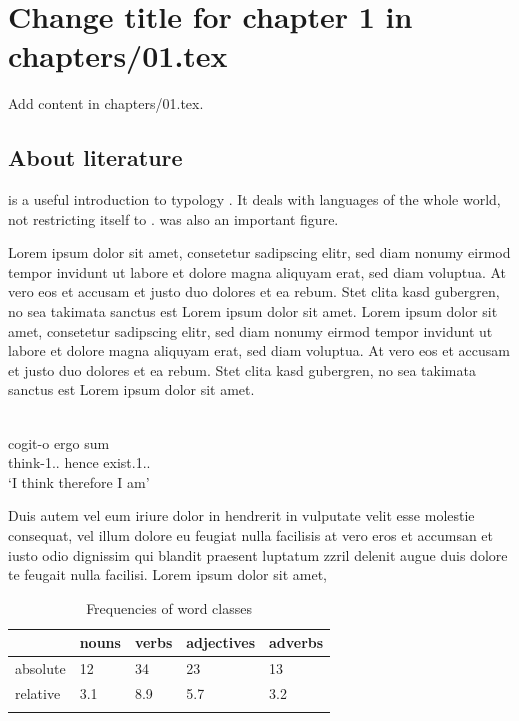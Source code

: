 \chapter{Change title for chapter 1 in chapters/01.tex}
Add content in chapters/01.tex.

\section{About literature}
\citet{Comrie1981} is a useful introduction to typology . %
It deals with languages of the whole world, not restricting itself to . %
 was also an important figure. %

Lorem ipsum dolor sit amet, consetetur sadipscing elitr, sed diam nonumy eirmod tempor invidunt ut labore et dolore magna aliquyam erat, sed diam voluptua. At vero eos et accusam et justo duo dolores et ea rebum. Stet clita kasd gubergren, no sea takimata sanctus est Lorem ipsum dolor sit amet. Lorem ipsum dolor sit amet, consetetur sadipscing elitr, sed diam nonumy eirmod tempor invidunt ut labore et dolore magna aliquyam erat, sed diam voluptua. At vero eos et accusam et justo duo dolores et ea rebum. Stet clita kasd gubergren, no sea takimata sanctus est Lorem ipsum dolor sit amet.

\ea\label{ex:1:descartes}
\\
\gll cogit-o ergo sum \\
     think-1{\sg}.{\prs}.{\ind} hence exist.1{\sg}.{\prs}.{\ind}\\
\glt `I think therefore I am'
\z

Duis autem vel eum iriure dolor in hendrerit in vulputate velit esse molestie consequat, vel illum dolore eu feugiat nulla facilisis at vero eros et accumsan et iusto odio dignissim qui blandit praesent luptatum zzril delenit augue duis dolore te feugait nulla facilisi. Lorem ipsum dolor sit amet,

\begin{table}
\caption{Frequencies of word classes}
\label{tab:1:frequencies}
 \begin{tabular}{lllll} %
  \lsptoprule
            & nouns & verbs & adjectives & adverbs\\ %
  \midrule
  absolute  &   12 &    34  &    23     & 13\\
  relative  &   3.1 &   8.9 &    5.7    & 3.2\\
  \lspbottomrule
 \end{tabular}
\end{table}


